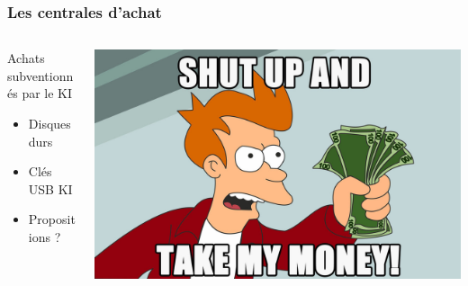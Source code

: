 \documentclass[14pt]{beamer}
\begin{document}
\begin{frame}
    \frametitle{Les centrales d'achat}
    \begin{columns}
        \begin{column}{.5\textwidth}
        Achats subventionnés par le KI
        \begin{itemize}
            \item Disques durs
            \item Clés USB KI
            \item Propositions ?
        \end{itemize}
        \end{column}
        \begin{column}{.5\textwidth}
            \includegraphics[width=\textwidth]{achats.jpg}
        \end{column}
  \end{columns}
\end{frame}
\end{document}
